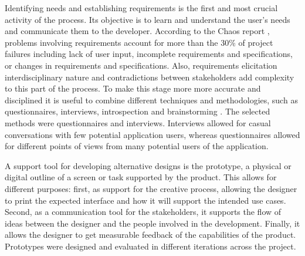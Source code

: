 Identifying needs and establishing requirements is the first and most crucial activity of the process. Its objective is to learn and understand the user's needs and communicate them to the developer. According to the Chaos report \cite{Group1994}, problems involving requirements account for more than the 30\% of project failures including lack of user input, incomplete requirements and specifications, or changes in requirements and specifications. Also, requirements elicitation interdisciplinary nature and contradictions between stakeholders add complexity to this part of the process. To make this stage more more accurate and disciplined it is useful to combine different techniques and methodologies, such as questionnaires, interviews, introspection and brainstorming \cite{Coulin2005}. The selected methods were questionnaires and interviews. Interviews allowed for casual conversations with few potential application users, whereas questionnaires allowed for different points of views from many potential users of the application. 

A support tool for developing alternative designs is the prototype, a physical or digital outline of a screen or task supported by the product. This allows for different purposes: first, as support for the creative process, allowing the designer to print the expected interface and how it will support the intended use cases. Second, as a communication tool for the stakeholders, it supports the flow of ideas between the designer and the people involved in the development. Finally, it allows the designer to get measurable feedback of the capabilities of the product. Prototypes were designed and evaluated in different iterations across the project.